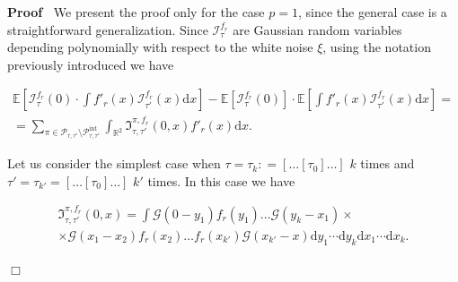 \documentclass[a4paper,10pt]{article}
\newcommand{\mathd}{\mathrm{d}}
\newcommand{\tmop}[1]{\ensuremath{\operatorname{#1}}}
\newenvironment{proof}{\noindent\textbf{Proof\ }}{\hspace*{\fill}$\Box$\medskip}
\begin{document}
\begin{proof}
  We present the proof only for the case $p = 1$, since the general case is a
  straightforward generalization. Since $\mathcal{I}^{f_r}_{\tau}$ are
  Gaussian random variables depending polynomially with respect to the white
  noise $\xi$, using the notation previously introduced we have
  
  \begin{multline*}
    \mathbb{E} \left[ \mathcal{I}^{f_r}_{\tau} (0) \cdot \int f'_r (x)
    \mathcal{I}^{f_r}_{\tau'} (x) \mathd x \right] -\mathbb{E}
    [\mathcal{I}^{f_r}_{\tau} (0)] \cdot \mathbb{E} \left[ \int f'_r (x)
    \mathcal{I}^{f_r}_{\tau'} (x) \mathd x \right] =\\
    = \sum_{\pi \in \mathcal{\mathcal{} \mathcal{P}}_{\tau, \tau'} \setminus
    \mathcal{P}^{\tmop{int}}_{\tau, \tau'}} \int_{\mathbb{R}^2}
    \mathfrak{I}^{\pi, f_r}_{\tau, \tau'} (0, x) f'_r (x) \mathd x.
  \end{multline*}
  
  Let us consider the simplest case when $\tau = \tau_k : = [\ldots [\tau_0]
  \ldots]$ $k$ times and $\tau' = \tau_{k'} = [\ldots [\tau_0] \ldots]$ $k'$
  times. In this case we have
  
  \begin{multline*}
    \mathfrak{I}^{\pi, f_r}_{\tau, \tau'} (0, x) = \int \mathcal{G} (0 - y_1)
    f_r (y_1) \ldots \mathcal{G} (y_k - x_1) \times\\
    \times \mathcal{G} (x_1 - x_2) f_r (x_2) \ldots f_r (x_{k'}) \mathcal{G}
    (x_{k'} - x) \mathd y_1 \cdots \mathd y_k \mathd x_1 \cdots \mathd x_k .
  \end{multline*}
  

\end{proof}
\end{document}

